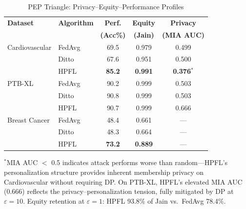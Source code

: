\documentclass[conference,a4paper]{IEEEtran}
\begin{document}
\begin{table}[htbp]
\centering
\caption{PEP Triangle: Privacy--Equity--Performance Profiles}
\label{tab:pep_triangle}
\small
\begin{tabular}{llccc}
\toprule
\textbf{Dataset} & \textbf{Algorithm} & \textbf{Perf.} & \textbf{Equity} & \textbf{Privacy} \\
 & & \textbf{(Acc\%)} & \textbf{(Jain)} & \textbf{(MIA AUC)} \\
\midrule
Cardiovascular & FedAvg & 69.5 & 0.979 & 0.499 \\
 & Ditto & 67.6 & 0.951 & 0.500 \\
 & HPFL & \textbf{85.2} & \textbf{0.991} & \textbf{0.376}$^*$ \\
\midrule
PTB-XL & FedAvg & 90.2 & 0.999 & 0.503 \\
 & Ditto & 90.8 & 0.999 & 0.503 \\
 & HPFL & 90.7 & 0.999 & 0.666 \\
\midrule
Breast Cancer & FedAvg & 48.4 & 0.661 & --- \\
 & Ditto & 48.3 & 0.664 & --- \\
 & HPFL & \textbf{73.2} & \textbf{0.889} & --- \\
\bottomrule
\end{tabular}

\vspace{1mm}
\footnotesize{$^*$MIA AUC $<$ 0.5 indicates attack performs worse than random---HPFL's personalization structure provides inherent membership privacy on Cardiovascular without requiring DP. On PTB-XL, HPFL's elevated MIA AUC (0.666) reflects the privacy--personalization tension, fully mitigated by DP at $\varepsilon{=}10$. Equity retention at $\varepsilon{=}1$: HPFL 93.8\% of Jain vs.\ FedAvg 78.4\%.}
\end{table}
\end{document}
